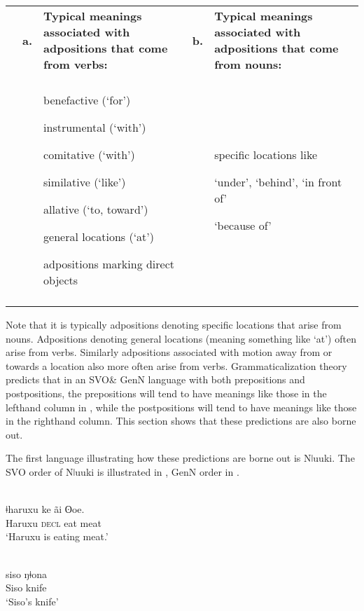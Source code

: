 \documentclass[output=paper]{langsci/langscibook}
\begin{document}
\begin{table}
\begin{tabularx}{\textwidth}{XXXXX}
\lsptoprule
& \bfseries a. & \bfseries Typical meanings associated with  adpositions that come from verbs: & \bfseries b. & \bfseries Typical meanings associated with adpositions that come from nouns:\\
&  &  &  & \\
&  & {benefactive (‘for’)}

{instrumental (‘with’)}

{comitative (‘with’)}

{similative (‘like’)}

{allative (‘to, toward’)}

{general locations (‘at’)}

adpositions marking direct objects &  & {specific locations like}

{‘under’, ‘behind’, ‘in front of’}

‘because of’\\
\lspbottomrule
\end{tabularx}
\end{table}

Note that it is typically adpositions denoting specific locations that arise from nouns. Adpositions denoting general locations (meaning something like ‘at’) often arise from verbs. Similarly adpositions associated with motion away from or towards a location also more often arise from verbs. Grammaticalization theory predicts that in an SVO\& GenN language with both prepositions and postpositions, the prepositions will tend to have meanings like those in the lefthand column in , while the postpositions will tend to have meanings like those in the righthand column. This section shows that these predictions are also borne out.

The first language illustrating how these predictions are borne out is Nǀuuki. The SVO order of Nǀuuki is illustrated in , GenN order in .

\ea\label{ex:dryer:}
\\
\gll ǂharuxu    ke  ãi  ʘoe.\\
       Haruxu  \textsc{decl}  eat  meat \\
\glt ‘Haruxu is eating meat.’  
\z

\ea\label{ex:dryer:}
\\
\gll siso  ŋǂona\\
       Siso  knife\\
\glt   ‘Siso’s knife’
\z
\end{document}
